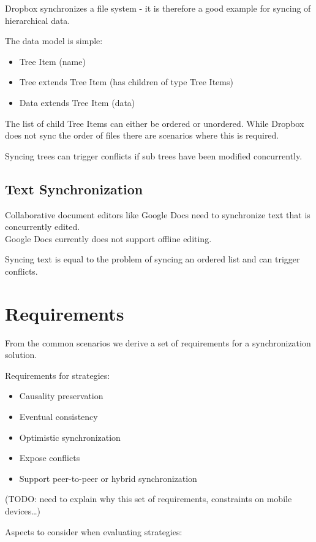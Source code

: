 Dropbox synchronizes a file system - it is therefore a good example for
syncing of hierarchical data.

The data model is simple:

\begin{itemize}
\item Tree Item (name)
\item Tree extends Tree Item (has children of type Tree Items)
\item Data extends Tree Item (data)
\end{itemize}

The list of child Tree Items can either be ordered or unordered. While
Dropbox does not sync the order of files there are scenarios where this
is required.

Syncing trees can trigger conflicts if sub trees have been modified
concurrently.

\subsection{Text Synchronization}

Collaborative document editors like Google Docs need to synchronize text
that is concurrently edited.\\Google Docs currently does not support
offline editing.

Syncing text is equal to the problem of syncing an ordered list and can
trigger conflicts.

\section{Requirements}
\label{sec:requirements}
From the common scenarios we derive a set of requirements for a synchronization solution.

Requirements for strategies:

\begin{itemize}
\item Causality preservation
\item Eventual consistency
\item Optimistic synchronization
\item Expose conflicts
\item Support peer-to-peer or hybrid synchronization
\end{itemize}

(TODO: need to explain why this set of requirements, constraints on
mobile devices\ldots{})

Aspects to consider when evaluating strategies:

